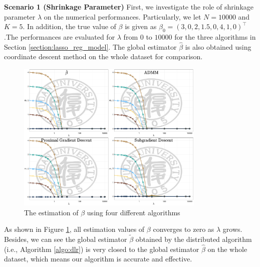 \documentclass[11pt,en,authoryear]{elegantpaper}
\numberwithin{equation}{section}
\begin{document}
\noindent
{\sc \textbf{Scenario 1 (Shrinkage Parameter)}}
First, we investigate the role of shrinkage parameter $\lambda$ on the numerical performances. Particularly, we let $N=10000$ and $K=5$. In addition, the true value of $\beta$ is given as $\beta_0 = (3, 0, 2, 1.5, 0, 4, 1, 0)^{\top}$.The performances are evaluated for $\lambda$ from $0$ to $10000$ for the three algorithms in Section \ref{section:lasso_reg_model}. The global estimator $\widehat{\beta}$ is also obtained using coordinate descent method on the whole dataset for comparison.
\vspace{-0.5cm}
\begin{center}
    \begin{figure}[h]
        \centering
        \includegraphics[width=0.8\textwidth]{image/scenario1}
        \caption{The estimation of $\beta$ using four different algorithms}
        \label{fig:shrinkage_para}
    \end{figure}
\end{center}
As shown in Figure \ref{fig:shrinkage_para}, all estimation values of $\beta$ converges to zero as $\lambda$ grows. Besides, we can see the global estimator $\tilde{\beta}$ obtained by the distributed algorithm (i.e., Algorithm \ref{algo:dlr}) is very closed to the global estimator $\widehat{\beta}$ on the whole dataset, which means our algorithm is accurate and effective. 
\end{document}
